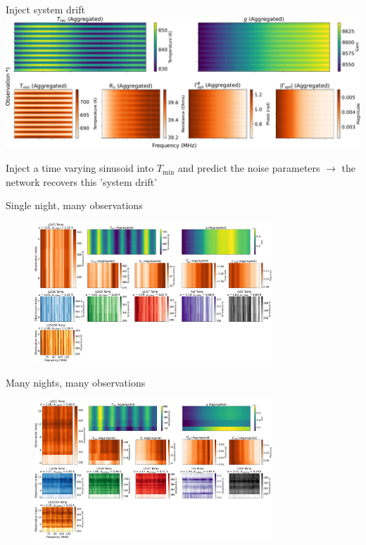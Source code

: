 \documentclass[aspectratio=169]{beamer}
\begin{document}
\begin{frame}{\small{Inject system drift}}
	\centering
	\includegraphics[width=\textwidth]{images/temps_combined_2d.pdf}
	\begin{tcolorbox}[colback=blue!5!white,colframe=blue!75!black,title=]
		Inject a time varying sinusoid into $T_{\text{min}}$ and predict the noise parameters $\rightarrow$ the network recovers this 'system drift'
	\end{tcolorbox}
\end{frame}

\begin{frame}{\small{Single night, many observations}}
	\begin{figure}
		\centering
		\includegraphics[width=0.8\textwidth]{images/pasted_image_20250403112230.png}
	\end{figure}
\end{frame}

\begin{frame}{\small{Many nights, many observations}}
	\begin{figure}
		\centering
		\includegraphics[width=0.8\textwidth]{images/pasted_image_20250410111857.png}
	\end{figure}
\end{frame}
\end{document}
